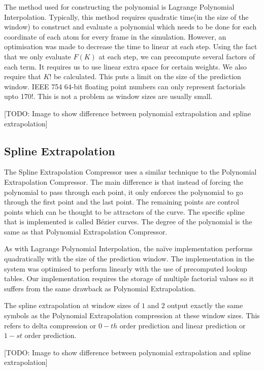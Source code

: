 \documentclass[a4paper,11pt]{report}
\begin{document}
The method used for constructing the polynomial is Lagrange Polynomial Interpolation. Typically, this method requires quadratic time(in the size of the window) to construct and evaluate a polynomial which needs to be done for each coordinate of each atom for every frame in the simulation. However, an optimisation was made to decrease the time to linear at each step. Using the fact that we only evaluate $F(K)$ at each step, we can precompute several factors of each term. It requires us to use linear extra space for certain weights. We also require that $K!$ be calculated. This puts a limit on the size of the prediction window. IEEE 754 64-bit floating point numbers can only represent factorials upto 170!. This is not a problem as window sizes are usually small.

[TODO: Image to show difference between polynomial extrapolation and spline extrapolation]

\subsection{Spline Extrapolation}

The Spline Extrapolation Compressor uses a similar technique to the Polynomial Extrapolation Compressor. The main difference is that instead of forcing the polynomial to pass through each point, it only enforces the polynomial to go through the first point and the last point. The remaining points are control points which can be thought to be attractors of the curve. The specific spline that is implemented is called B\'ezier curves. The degree of the polynomial is the same as that Polynomial Extrapolation Compressor.

As with Lagrange Polynomial Interpolation, the na\"ive implementation performs quadratically with the size of the prediction window. The implementation in the system was optimised to perform linearly with the use of precomputed lookup tables. Our implementation requires the storage of multiple factorial values so it suffers from the same drawback as Polynomial Extrapolation.

The spline extrapolation at window sizes of $1$ and $2$ output exactly the same symbols as the Polynomial Extrapolation compression at these window sizes. This refers to delta compression or $0-th$ order prediction and linear prediction or $1-st$ order prediction.  

[TODO: Image to show difference between polynomial extrapolation and spline extrapolation]
\end{document}
